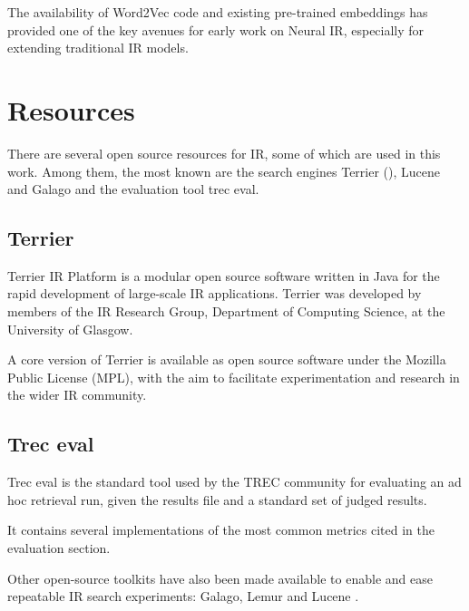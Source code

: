 The availability of Word2Vec code and existing pre-trained embeddings has provided one of the key avenues for early work on Neural IR, especially for extending traditional IR models.

\section{Resources}

There are several open source resources for IR, some of which are used in this work. Among them, the most known are the search engines Terrier (\cite{terrier}), Lucene and Galago and the evaluation tool trec eval.

\subsection{Terrier}

Terrier IR Platform is a modular open source software written in Java for the rapid development of large-scale IR applications. Terrier was developed by members of the IR Research Group, Department of Computing Science, at the University of Glasgow.

A core version of Terrier is available as open source software under the Mozilla Public License (MPL), with the aim to facilitate experimentation and research in the wider IR community.

\subsection{Trec eval}

Trec eval is the standard tool used by the TREC community for evaluating an ad hoc retrieval run, given the results file and a standard set of judged results. 

It contains several implementations of the most common metrics cited in the evaluation section.

Other open-source toolkits have also been made available to enable and ease repeatable IR search experiments: Galago, Lemur and Lucene \cite{croftIR}.
